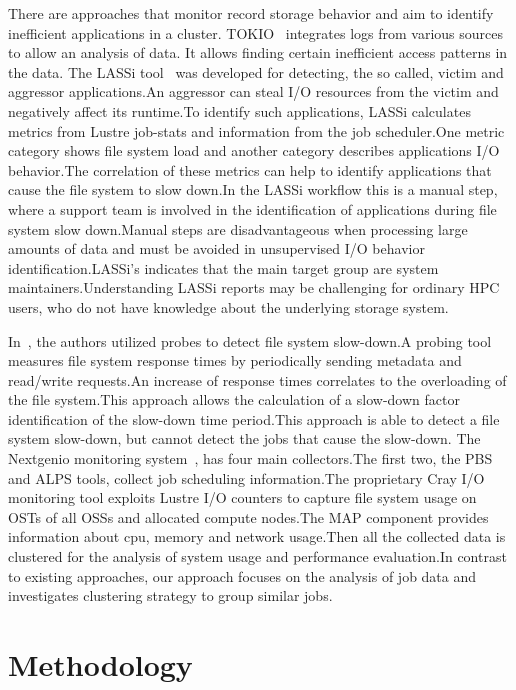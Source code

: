\documentclass[]{llncs}
\begin{document}
There are approaches that monitor record storage behavior and aim to identify inefficient applications in a cluster.
TOKIO~\cite{lockwood2018tokio} integrates logs from various sources to allow an analysis of data.
It allows finding certain inefficient access patterns in the data.
The LASSi tool~\cite{DBLP:journals/corr/abs-1906-03884} was developed for detecting, the so called, victim and aggressor applications.An aggressor can steal I/O resources from the victim and negatively affect its runtime.To identify such applications, LASSi calculates metrics from Lustre job-stats and information from the job scheduler.One metric category shows file system load and another category describes applications I/O behavior.The correlation of these metrics can help to identify applications that cause the file system to slow down.In the LASSi workflow this is a manual step, where a support team is involved in the identification of applications during file system slow down.Manual steps are disadvantageous when processing large amounts of data and must be avoided in unsupervised I/O behavior identification.LASSi's indicates that the main target group are system maintainers.Understanding LASSi reports may be challenging for ordinary HPC users, who do not have knowledge about the underlying storage system.

In~\cite{TUISVPKB19}, the authors utilized probes to detect file system slow-down.A probing tool measures file system response times by periodically sending metadata and read/write requests.An increase of response times correlates to the overloading of the file system.This approach allows the calculation of a slow-down factor identification of the slow-down time period.This approach is able to detect a file system slow-down, but cannot detect the jobs that cause the slow-down.
The Nextgenio monitoring system~\cite{nextgenio2016}, has four main collectors.The first two, the PBS and ALPS tools, collect job scheduling information.The proprietary Cray I/O monitoring tool exploits Lustre I/O counters to capture file system usage on OSTs of all OSSs and allocated compute nodes.The MAP component provides information about cpu, memory and network usage.Then all the collected data is clustered for the analysis of system usage and performance evaluation.In contrast to existing approaches, our approach focuses on the analysis of job data and investigates clustering strategy to group similar jobs.

\section{Methodology}
\end{document}
